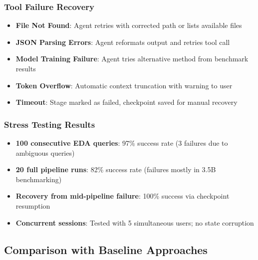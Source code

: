\documentclass[11pt,a4paper]{article}
\begin{document}
\subsubsection{Tool Failure Recovery}

\begin{itemize}
    \item \textbf{File Not Found}: Agent retries with corrected path or lists available files
    \item \textbf{JSON Parsing Errors}: Agent reformats output and retries tool call
    \item \textbf{Model Training Failure}: Agent tries alternative method from benchmark results
    \item \textbf{Token Overflow}: Automatic context truncation with warning to user
    \item \textbf{Timeout}: Stage marked as failed, checkpoint saved for manual recovery
\end{itemize}

\subsubsection{Stress Testing Results}

\begin{itemize}
    \item \textbf{100 consecutive EDA queries}: 97\% success rate (3 failures due to ambiguous queries)
    \item \textbf{20 full pipeline runs}: 82\% success rate (failures mostly in 3.5B benchmarking)
    \item \textbf{Recovery from mid-pipeline failure}: 100\% success via checkpoint resumption
    \item \textbf{Concurrent sessions}: Tested with 5 simultaneous users; no state corruption
\end{itemize}

\subsection{Comparison with Baseline Approaches}
\end{document}

